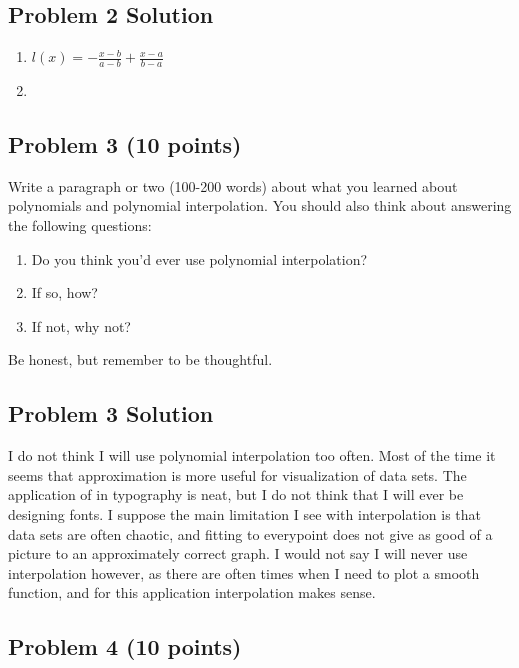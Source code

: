 \documentclass[]{article}
\begin{document}
\subsection{Problem 2 Solution} %
\begin{enumerate}
\def\labelenumi{\arabic{enumi}.}
\item
$l(x) = -\frac{x-b}{a-b} + \frac{x-a}{b-a} $
\item
\end{enumerate}


\subsection{Problem 3 (10 points)}\label{problem-3-10-points}

Write a paragraph or two (100-200 words) about what you learned about
polynomials and polynomial interpolation. You should also think about
answering the following questions:

\begin{enumerate}
\def\labelenumi{\arabic{enumi}.}
\itemsep1pt\parskip0pt
\item
  Do you think you'd ever use polynomial interpolation?
\item
  If so, how?
\item
  If not, why not?
\end{enumerate}

Be honest, but remember to be thoughtful.

\subsection{Problem 3 Solution} %

\def\labelenumi{\arabic{enumi}.}
I do not think I will use polynomial interpolation too often. Most of the time it seems that approximation is more useful for visualization of data sets. The application of in typography is neat, but I do not think that I will ever be designing fonts. I suppose the main limitation I see with interpolation is that data sets are often chaotic, and fitting to everypoint does not give as good of a picture to an approximately correct graph. I would not say I will never use interpolation however, as there are often times when I need to plot a smooth function, and for this application interpolation makes sense. 



\subsection{Problem 4 (10 points)}\label{problem-4-10-points}
\end{document}
